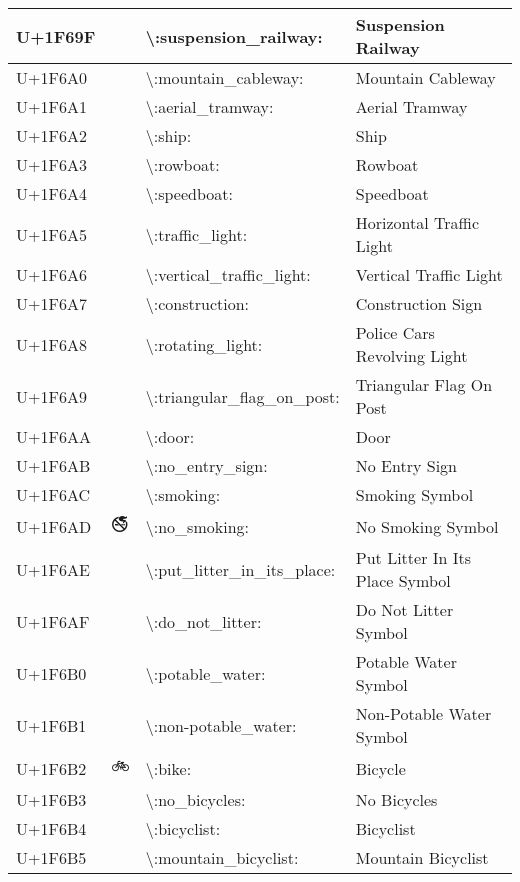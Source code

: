 \begin{table}[h]
\begin{tabulary}{\linewidth}{|L|L|L|L|}
\hline
U+1F69F & 🚟 & {\textbackslash}:suspension\_railway: & Suspension Railway \\
\hline
U+1F6A0 & 🚠 & {\textbackslash}:mountain\_cableway: & Mountain Cableway \\
\hline
U+1F6A1 & 🚡 & {\textbackslash}:aerial\_tramway: & Aerial Tramway \\
\hline
U+1F6A2 & 🚢 & {\textbackslash}:ship: & Ship \\
\hline
U+1F6A3 & 🚣 & {\textbackslash}:rowboat: & Rowboat \\
\hline
U+1F6A4 & 🚤 & {\textbackslash}:speedboat: & Speedboat \\
\hline
U+1F6A5 & 🚥 & {\textbackslash}:traffic\_light: & Horizontal Traffic Light \\
\hline
U+1F6A6 & 🚦 & {\textbackslash}:vertical\_traffic\_light: & Vertical Traffic Light \\
\hline
U+1F6A7 & 🚧 & {\textbackslash}:construction: & Construction Sign \\
\hline
U+1F6A8 & 🚨 & {\textbackslash}:rotating\_light: & Police Cars Revolving Light \\
\hline
U+1F6A9 & 🚩 & {\textbackslash}:triangular\_flag\_on\_post: & Triangular Flag On Post \\
\hline
U+1F6AA & 🚪 & {\textbackslash}:door: & Door \\
\hline
U+1F6AB & 🚫 & {\textbackslash}:no\_entry\_sign: & No Entry Sign \\
\hline
U+1F6AC & 🚬 & {\textbackslash}:smoking: & Smoking Symbol \\
\hline
U+1F6AD & 🚭 & {\textbackslash}:no\_smoking: & No Smoking Symbol \\
\hline
U+1F6AE & 🚮 & {\textbackslash}:put\_litter\_in\_its\_place: & Put Litter In Its Place Symbol \\
\hline
U+1F6AF & 🚯 & {\textbackslash}:do\_not\_litter: & Do Not Litter Symbol \\
\hline
U+1F6B0 & 🚰 & {\textbackslash}:potable\_water: & Potable Water Symbol \\
\hline
U+1F6B1 & 🚱 & {\textbackslash}:non-potable\_water: & Non-Potable Water Symbol \\
\hline
U+1F6B2 & 🚲 & {\textbackslash}:bike: & Bicycle \\
\hline
U+1F6B3 & 🚳 & {\textbackslash}:no\_bicycles: & No Bicycles \\
\hline
U+1F6B4 & 🚴 & {\textbackslash}:bicyclist: & Bicyclist \\
\hline
U+1F6B5 & 🚵 & {\textbackslash}:mountain\_bicyclist: & Mountain Bicyclist \\

\end{tabulary}
\end{table}
